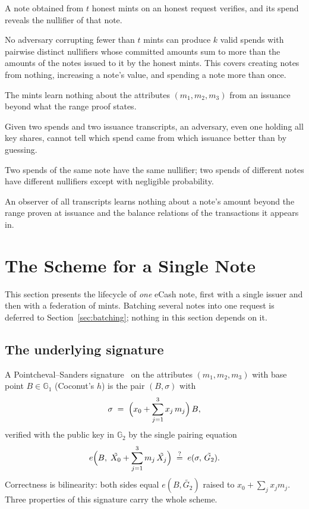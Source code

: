 \documentclass[10pt,a5paper]{article}
\newcommand{\K}[1]{#1}                      %
\newcommand{\Go}[1]{#1}                     %
\newcommand{\Gt}[1]{\tilde{#1}}             %
\newcommand{\GT}[1]{#1}                     %
\newcommand{\K}[1]{{\color{ScalarCol}#1}}   %
\newcommand{\Go}[1]{{\color{GoneCol}#1}}    %
\newcommand{\Gt}[1]{{\color{GtwoCol}#1}}    %
\newcommand{\GT}[1]{{\color{GtCol}#1}}      %
\newcommand{\GG}[1]{\mathbb{G}_{#1}}
\newcommand{\eqq}{\stackrel{?}{=}}
\begin{document}
\begin{description}[nosep,leftmargin=1.2em]
\item[Correctness.] A note obtained from $t$ honest mints on an honest request
  verifies, and its spend reveals the nullifier of that note.
\item[Unforgeability (balance).] No adversary corrupting fewer than $t$ mints
  can produce $k$ valid spends with pairwise distinct nullifiers whose committed
  amounts sum to more than the amounts of the notes issued to it by the honest
  mints. This covers creating notes from nothing, increasing a note's value,
  and spending a note more than once.
\item[Blindness.] The mints learn nothing about the attributes
  $(\K{m_1},\K{m_2},\K{m_3})$ from an issuance beyond what the range proof
  states.
\item[Unlinkability.] Given two spends and two issuance transcripts, an
  adversary, even one holding all key shares, cannot tell which spend came from
  which issuance better than by guessing.
\item[Double-spend detection.] Two spends of the same note have the same
  nullifier; two spends of different notes have different nullifiers except
  with negligible probability.
\item[Value confidentiality.] An observer of all transcripts learns nothing
  about a note's amount beyond the range proven at issuance and the balance
  relations of the transactions it appears in.
\end{description}

\section{The Scheme for a Single Note}
\label{sec:scheme}

This section presents the lifecycle of \emph{one} eCash note, first with a
single issuer and then with a federation of mints. Batching several notes into
one request is deferred to Section~\ref{sec:batching}; nothing in this section
depends on it.

\subsection{The underlying signature}
\label{sec:ps}

A Pointcheval--Sanders signature~\cite{ps16} on the attributes
$(\K{m_1},\K{m_2},\K{m_3})$ with base point $\Go{B} \in \GG{1}$ (Coconut's $h$) is the pair
$(\Go{B}, \Go{\sigma})$ with
\begin{equation}
  \Go{\sigma} \;=\; \Bigl(\K{x_0} + \sum_{j=1}^{3} \K{x_j}\,\K{m_j}\Bigr)\,\Go{B},
  \label{eq:ps}
\end{equation}
verified with the public key in $\GG{2}$ by the single pairing equation
\begin{equation}
  e\Bigl(\Go{B},\; \Gt{X_0} + \sum_{j=1}^{3} \K{m_j}\,\Gt{X_j}\Bigr) \;\eqq\; e(\Go{\sigma},\, \Gt{G_2}).
  \label{eq:psverify}
\end{equation}
Correctness is bilinearity: both sides equal
$\GT{e(\Go{B},\Gt{G_2})}$ raised to $\K{x_0} + \sum_j \K{x_j}\K{m_j}$.
Three properties of this signature carry the whole scheme.
\end{document}
